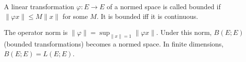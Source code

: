 A linear transformation $\varphi: E \to E$ of a normed space is called bounded if $\|\varphi x\| \leq M \|x\|$ for some $M$. It is bounded iff it is continuous.

The operator norm is $\|\varphi\| = \sup_{\|x\| = 1} \|\varphi x\|$. Under this norm, $B(E; E)$ (bounded transformations) becomes a normed space. In finite dimensions, $B(E; E) = L(E; E)$.

